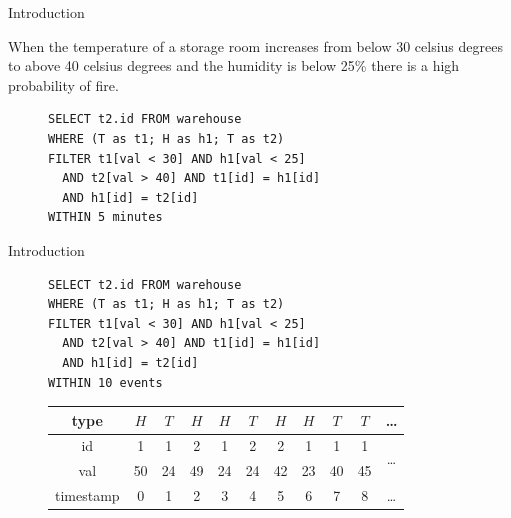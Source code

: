 \documentclass[xcolor=pdftex,dvipsnames,table]{beamer}
\begin{document}
\begin{frame}[fragile]{Introduction}
  \begin{example}{}
    When the temperature of a storage room increases from below 30 celsius degrees to above 40 celsius degrees and the humidity is below 25\% there is a high probability of fire.
    \begin{figure}[H]
      \begin{verbatim}
SELECT t2.id FROM warehouse
WHERE (T as t1; H as h1; T as t2)
FILTER t1[val < 30] AND h1[val < 25]
  AND t2[val > 40] AND t1[id] = h1[id]
  AND h1[id] = t2[id]
WITHIN 5 minutes
      \end{verbatim}
    \end{figure}
  \end{example}
\end{frame}

\begin{frame}[fragile]{Introduction}
 \begin{example}{}
    \begin{figure}[H]
      \begin{verbatim}
SELECT t2.id FROM warehouse
WHERE (T as t1; H as h1; T as t2)
FILTER t1[val < 30] AND h1[val < 25]
  AND t2[val > 40] AND t1[id] = h1[id]
  AND h1[id] = t2[id]
WITHIN 10 events
      \end{verbatim}
    \end{figure}
    \begin{figure}[H]
      \centering
      \begin{tabular}{|c|c|c|c|c|c|c|c|c|c|c}\hline
        type  &$H$&$T$&$H$&$H$&$T$&$H$&$H$&$T$&$T$ & \ldots \\ \hline
        id  & 1 & 1 & 2 & 1 & 2 & 2 & 1 & 1 & 1 & \multirow{2}{*}{\ldots} \\
        val & 50 & 24& 49& 24& 24& 42& 23& 40& 45\\ \hline
        timestamp & 0 & 1 & 2 & 3 & 4 & 5 & 6 & 7 & 8 & \ldots \\ \hline
      \end{tabular}
    \end{figure}
 \end{example}
\end{frame}
\end{document}
